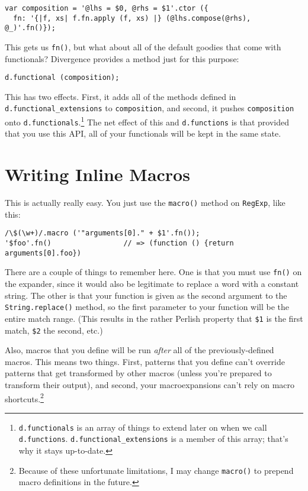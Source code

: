 \documentclass{report}
\begin{document}
\begin{verbatim}
var composition = '@lhs = $0, @rhs = $1'.ctor ({
  fn: '{|f, xs| f.fn.apply (f, xs) |} (@lhs.compose(@rhs), @_)'.fn()});
\end{verbatim}

      This gets us \verb|fn()|, but what about all of the default goodies that come with functionals? Divergence provides a method just for this purpose:

\begin{verbatim}
d.functional (composition);
\end{verbatim}

      This has two effects. First, it adds all of the methods defined in \verb|d.functional_extensions| to \verb|composition|, and second, it pushes \verb|composition| onto
      \verb|d.functionals|.\footnote{{\tt d.functionals} is an array of things to extend later on when we call {\tt d.functions}. {\tt d.functional\_extensions} is a member of this array;
      that's why it stays up-to-date.} The net effect of this and \verb|d.functions| is that provided that you use this API, all of your functionals will be kept in the same state.

\chapter {Writing Inline Macros}
    This is actually really easy. You just use the \verb|macro()| method on \verb|RegExp|, like this:

\begin{verbatim}
/\$(\w+)/.macro ('"arguments[0]." + $1'.fn());
'$foo'.fn()                 // => (function () {return arguments[0].foo})
\end{verbatim}

    There are a couple of things to remember here. One is that you must use \verb|fn()| on the expander, since it would also be legitimate to replace a word with a constant string. The other
    is that your function is given as the second argument to the \verb|String.replace()| method, so the first parameter to your function will be the entire match range. (This results in the
    rather Perlish property that \verb|$1| is the first match, \verb|$2| the second, etc.)

    Also, macros that you define will be run {\em after} all of the previously-defined macros. This means two things. First, patterns that you define can't override patterns that get
    transformed by other macros (unless you're prepared to transform their output), and second, your macroexpansions can't rely on macro shortcuts.\footnote{Because of these unfortunate
    limitations, I may change {\tt macro()} to prepend macro definitions in the future.}
\end{document}
